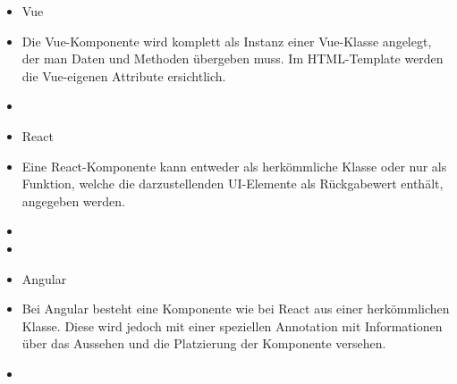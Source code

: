 \begin{itemize}
    \captionsetup{justification=centering}
    \item{Vue}
    \item[] Die Vue-Komponente wird komplett als Instanz einer Vue-Klasse angelegt, der man Daten und Methoden übergeben muss. Im HTML-Template werden die Vue-eigenen Attribute ersichtlich.
    \item[] 
    \item{React}
    \item[] Eine React-Komponente kann entweder als herkömmliche Klasse oder nur als Funktion, welche die darzustellenden UI-Elemente als Rückgabewert enthält, angegeben werden.
    \item[] 
    \item[] 
    \item{Angular}
    \item[] Bei Angular besteht eine Komponente wie bei React aus einer herkömmlichen Klasse. Diese wird jedoch mit einer speziellen Annotation mit Informationen über das Aussehen und die Platzierung der Komponente versehen.
    \item[] 
\end{itemize}

